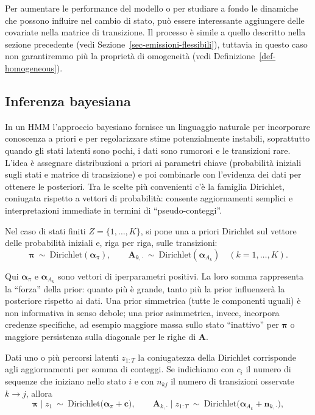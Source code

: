 \documentclass[
  italian,
  a4paper,
  a4paper,
  twoside,
  open=right,
  12pt]{scrbook}
\theoremstyle{definition}
\theoremstyle{remark}
\begin{document}
Per aumentare le performance del modello o per studiare a fondo le
dinamiche che possono influire nel cambio di stato, può essere
interessante aggiungere delle covariate nella matrice di transizione. Il
processo è simile a quello descritto nella sezione precedente (vedi
Sezione~\ref{sec-emissioni-flessibili}), tuttavia in questo caso non
garantiremmo più la proprietà di omogeneità (vedi
Definizione~\ref{def-homogeneous}).

\subsection{Inferenza bayesiana}\label{inferenza-bayesiana}

In un HMM l'approccio bayesiano fornisce un linguaggio naturale per
incorporare conoscenza a priori e per regolarizzare stime potenzialmente
instabili, soprattutto quando gli stati latenti sono pochi, i dati sono
rumorosi e le transizioni rare. L'idea è assegnare distribuzioni a
priori ai parametri chiave (probabilità iniziali sugli stati e matrice
di transizione) e poi combinarle con l'evidenza dei dati per ottenere le
posteriori. Tra le scelte più convenienti c'è la famiglia Dirichlet,
coniugata rispetto a vettori di probabilità: consente aggiornamenti
semplici e interpretazioni immediate in termini di ``pseudo-conteggi''.

Nel caso di stati finiti \(Z=\{1,\dots,K\}\), si pone una a priori
Dirichlet sul vettore delle probabilità iniziali e, riga per riga, sulle
transizioni: \[
\boldsymbol{\pi}\ \sim\ \mathrm{Dirichlet}(\boldsymbol{\alpha}_\pi),
\qquad
\mathbf{A}_{k,\cdot}\ \sim\ \mathrm{Dirichlet}(\boldsymbol{\alpha}_{A_k})\quad (k=1,\dots,K).
\]

Qui \(\boldsymbol{\alpha}_\pi\) e \(\boldsymbol{\alpha}_{A_k}\) sono
vettori di iperparametri positivi. La loro somma rappresenta la
``forza'' della prior: quanto più è grande, tanto più la prior
influenzerà la posteriore rispetto ai dati. Una prior simmetrica (tutte
le componenti uguali) è non informativa in senso debole; una prior
asimmetrica, invece, incorpora credenze specifiche, ad esempio maggiore
massa sullo stato ``inattivo'' per \(\boldsymbol{\pi}\) o maggiore
persistenza sulla diagonale per le righe di \(\mathbf{A}\).

Dati uno o più percorsi latenti \(z_{1:T}\) la coniugatezza della
Dirichlet corrisponde agli aggiornamenti per somma di conteggi. Se
indichiamo con \(c_i\) il numero di sequenze che iniziano nello stato
\(i\) e con \(n_{k j}\) il numero di transizioni osservate \(k\to j\),
allora \[
\boldsymbol{\pi}\mid z_{1} \ \sim\ \mathrm{Dirichlet}\big(\boldsymbol{\alpha}_\pi + \mathbf{c}\big),
\qquad
\mathbf{A}_{k,\cdot}\mid z_{1:T} \ \sim\ \mathrm{Dirichlet}\big(\boldsymbol{\alpha}_{A_k} + \mathbf{n}_{k,\cdot}\big),
\]
\end{document}
